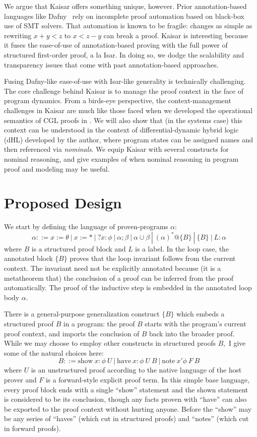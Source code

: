 \documentclass[12pt]{cmuthesis}
\theoremstyle{definition}
\theoremstyle{remark}
\newcommand{\rref}[2][]{\prettyref{#2}}
\newcommand{\dHL}{\textsf{dHL}\xspace}
\newcommand{\CGL}{\textsf{CGL}\xspace}
\begin{document}
We argue that Kaisar offers something unique, however.
Prior annotation-based languages like Dafny~\cite{DBLP:conf/lpar/Leino10} rely on incomplete proof automation based on black-box use of SMT solvers.
That automation is known to be fragile: changes as simple as rewriting $x + y < z$ to $x < z - y$ can break a proof.
Kaisar is interesting because it fuses the ease-of-use of annotation-based proving with the full power of structured first-order proof, a la Isar.
In doing so, we dodge the scalability and transparency issues that come with past annotation-based approaches.

Fusing Dafny-like ease-of-use with Isar-like generality is technically challenging.
The core challenge behind Kaisar is to manage the proof context in the face of program dynamics.
From a birds-eye perspective, the context-management challenges in Kaisar are much like those faced when we developed the operational semantics of \CGL proofs in \rref{ch:cgl}.
We will also show that (in the systems case) this context can be understood in the context of differential-dynamic hybrid logic (\dHL) developed by the author, where program states can be assigned names and then referenced via \emph{nominals}.
We equip Kaisar with several constructs for nominal reasoning, and give examples of when nominal reasoning in program proof and modeling may be useful.


\section{Proposed Design}
We start by defining the language of proven-programs $\alpha$:
\[\alpha ::= x{:=}\theta\ |\ x{:=}*\ |\ ?x:\phi\ |\ \alpha;\beta\ |\ \alpha\cup\beta\ |\ (\alpha)^*@\{B\}\ |\ \{B\}\ |\ L: \alpha\]
where $B$ is a structured proof block and $L$ is a label.
In the loop case, the annotated block $\{B\}$ proves that the loop invariant follows from the current context.
The invariant need not be explicitly annotated because (it is a metatheorem that) the conclusion of a proof can be inferred from the proof automatically.
The proof of the inductive step is embedded in the annotated loop body $\alpha$.

There is a general-purpose generalization construct $\{B\}$ which embeds a structured proof $B$ in a program: the proof $B$ starts with the program's current proof context, and imports the conclusion of $B$ back into the broader proof.
While we may choose to employ other constructs in structured proofs $B,$ I give some of the natural choices here:
\[B ::= \text{show}~x:\phi~U\ |\ \text{have}~x:\phi~U~B\ |\ \text{note}~x'\phi~F~B\]
where $U$ is an unstructured proof according to the native language of the host prover and $F$ is a forward-style explicit proof term.
In this simple base language, every proof block ends with a single ``show'' statement and the shown statement is considered to be its conclusion, though any facts proven with ``have'' can also be exported to the proof context without hurting anyone.
Before the ``show'' may be any series of ``haves'' (which cut in structured proofs) and ``notes'' (which cut in forward proofs).
\end{document}
